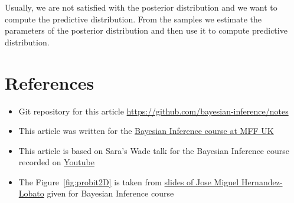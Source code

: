 Usually, we are not satisfied with the posterior distribution and we want to compute the predictive distribution.
From the samples we estimate the parameters of the posterior distribution and then use it to compute predictive distribution.





\section*{References}
\begin{itemize}
    \item Git repository for this article \url{https://github.com/bayesian-inference/notes}
    \item This article was written for the \href{https://sites.google.com/site/filipjurcicek/teaching/bayesian-inference}{Bayesian Inference course at MFF UK}
    \item This article is based on Sara's Wade talk for the Bayesian Inference course recorded on \href{http://youtu.be/rsUt9uV6j70?t=12m18s}{Youtube}
    \item The Figure~\ref{fig:probit2D} is taken from \href{https://sites.google.com/site/filipjurcicek/teaching/bayesian-inference/NPFL108-slidesLecture3.pdf?attredirects=0}{slides of Jose Miguel Hernandez-Lobato} given for Bayesian Inference course
\end{itemize}





